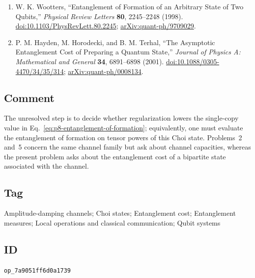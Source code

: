 \begin{enumerate}[label={},leftmargin=4.8em,labelsep=0.5em]
  \footnotesize
  \item[\textup{[Woo98]}]\label{ref:p8-wootters}
  W. K. Wootters,
  ``Entanglement of Formation of an Arbitrary State of Two Qubits,''
  \emph{Physical Review Letters} \textbf{80}, 2245--2248 (1998).
  \href{https://doi.org/10.1103/PhysRevLett.80.2245}%
       {doi:10.1103/PhysRevLett.80.2245};
  \href{https://arxiv.org/abs/quant-ph/9709029}{arXiv:quant-ph/9709029}.

  \item[\textup{[HHT01]}]\label{ref:p8-hayden-horodecki-terhal}
  P. M. Hayden, M. Horodecki, and B. M. Terhal,
  ``The Asymptotic Entanglement Cost of Preparing a Quantum State,''
  \emph{Journal of Physics A: Mathematical and General} \textbf{34},
  6891--6898 (2001).
  \href{https://doi.org/10.1088/0305-4470/34/35/314}%
       {doi:10.1088/0305-4470/34/35/314};
  \href{https://arxiv.org/abs/quant-ph/0008134}{arXiv:quant-ph/0008134}.
\end{enumerate}

\subsection*{Comment}

The unresolved step is to decide whether regularization lowers the
single-copy value in Eq.~\eqref{eq:p8-entanglement-of-formation}; equivalently,
one must evaluate the entanglement of formation on tensor powers of this Choi
state.  Problems~2 and~5 concern the same channel family but ask about channel
capacities, whereas the present problem asks about the entanglement cost of a
bipartite state associated with the channel.

\subsection*{Tag}

Amplitude-damping channels; Choi states; Entanglement cost;
Entanglement measures; Local operations and classical communication;
Qubit systems

\subsection*{ID}

\texttt{op\_7a9051ff6d0a1739}
